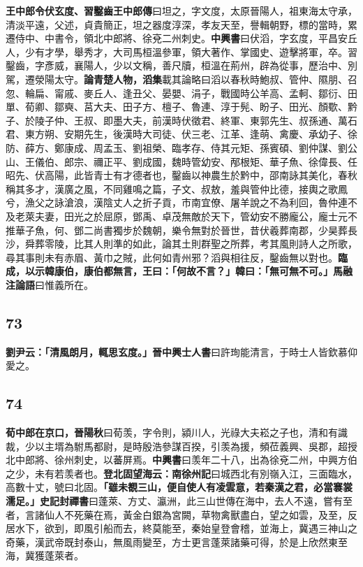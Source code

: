 \textbf{王中郎令伏玄度、習鑿齒}{\footnotesize \textbf{王中郎傳}曰坦之，字文度，太原晉陽人，祖東海太守承，清淡平遠，父述，貞貴簡正，坦之器度淳深，孝友天至，譽輯朝野，標的當時，累遷侍中、中書令，領北中郎將、徐兗二州刺史。\textbf{中興書}曰伏滔，字玄度，平昌安丘人，少有才學，舉秀才，大司馬桓溫參軍，領大著作、掌國史、遊擊將軍，卒。習鑿齒，字彥威，襄陽人，少以文稱，善尺牘，桓溫在荊州，辟為從事，歷治中、別駕，遷滎陽太守。}\textbf{論青楚人物，}{\footnotesize \textbf{滔集}載其論略曰滔以春秋時鮑叔、管仲、隰朋、召忽、輪扁、甯戚、麥丘人、逢丑父、晏嬰、涓子，戰國時公羊高、孟軻、鄒衍、田單、荀卿、鄒奭、莒大夫、田子方、檀子、魯連、淳于髡、盼子、田光、顏歜、黔子、於陵子仲、王叔、即墨大夫，前漢時伏徵君、終軍、東郭先生、叔孫通、萬石君、東方朔、安期先生，後漢時大司徒、伏三老、江革、逢萌、禽慶、承幼子、徐防、薛方、鄭康成、周孟玉、劉祖榮、臨孝存、侍其元矩、孫賓碩、劉仲謀、劉公山、王儀伯、郎宗、禰正平、劉成國，魏時管幼安、邴根矩、華子魚、徐偉長、任昭先、伏高陽，此皆青士有才德者也，鑿齒以神農生於黔中，邵南詠其美化，春秋稱其多才，漢廣之風，不同雞鳴之篇，子文、叔敖，羞與管仲比德，接輿之歌鳳兮，漁父之詠滄浪，漢陰丈人之折子貢，市南宜僚、屠羊說之不為利回，魯仲連不及老萊夫妻，田光之於屈原，鄧禹、卓茂無敵於天下，管幼安不勝龐公，龐士元不推華子魚，何、鄧二尚書獨步於魏朝，樂令無對於晉世，昔伏羲葬南郡，少昊葬長沙，舜葬零陵，比其人則準的如此，論其土則群聖之所葬，考其風則詩人之所歌，尋其事則未有赤眉、黃巾之賊，此何如青州邪？滔與相往反，鑿齒無以對也。}\textbf{臨成，以示韓康伯，康伯都無言，王曰：「何故不言？」韓曰：「無可無不可。」}{\footnotesize \textbf{馬融注論語}曰惟義所在。}

\subsection*{73}

\textbf{劉尹云：「清風朗月，輒思玄度。」}{\footnotesize \textbf{晉中興士人書}曰許珣能清言，于時士人皆欽慕仰愛之。}

\subsection*{74}

\textbf{荀中郎在京口，}{\footnotesize \textbf{晉陽秋}曰荀羡，字令則，潁川人，光祿大夫崧之子也，清和有識裁，少以主壻為駙馬都尉，是時殷浩參謀百揆，引羡為援，頻莅義興、吳郡，超授北中郎將、徐州刺史，以蕃屏焉。\textbf{中興書}曰羡年二十八，出為徐兗二州，中興方伯之少，未有若羡者也。}\textbf{登北固望海云：}{\footnotesize \textbf{南徐州記}曰城西北有別嶺入江，三面臨水，高數十丈，號曰北固。}\textbf{「雖未覩三山，便自使人有凌雲意，若秦漢之君，必當褰裳濡足。」}{\footnotesize \textbf{史記封禪書}曰蓬萊、方丈、瀛洲，此三山世傳在海中，去人不遠，嘗有至者，言諸仙人不死藥在焉，黃金白銀為宮闕，草物禽獸盡白，望之如雲，及至，反居水下，欲到，即風引船而去，終莫能至，秦始皇登會稽，並海上，冀遇三神山之奇藥，漢武帝既封泰山，無風雨變至，方士更言蓬萊諸藥可得，於是上欣然東至海，冀獲蓬萊者。}

